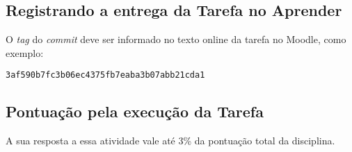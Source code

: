 \subsection{Registrando a entrega da Tarefa no Aprender}

O \textit{tag} do \textit{commit} deve ser informado no texto online da tarefa no Moodle, como exemplo:
\begin{verbatim}
3af590b7fc3b06ec4375fb7eaba3b07abb21cda1
\end{verbatim}

\subsection{Pontuação pela execução da  Tarefa}

A sua resposta a essa atividade vale até 3\% da pontuação total da disciplina.

